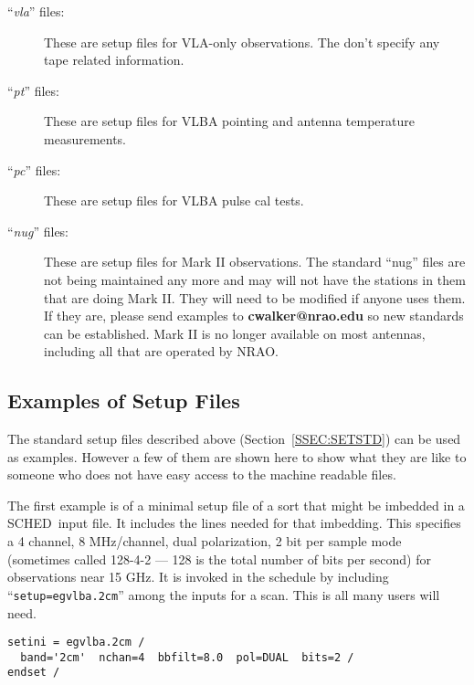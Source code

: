 \documentclass{report}
\newcommand{\schedb}{{\sc SCHED~}}
\begin{document}
\begin{description}
\item[``{\sl vla}'' files:]  These are setup files for VLA-only
observations.  The don't specify any tape related information.

\item[``{\sl pt}'' files:] These are setup files for VLBA pointing and
antenna temperature measurements.

\item[``{\sl pc}'' files:] These are setup files for VLBA pulse cal
tests.

\item[``{\sl nug}'' files:]  These are setup files for Mark II
observations.  The standard ``nug'' files are not being maintained any
more and may will not have the stations in them that are doing Mark
II.  They will need to be modified if anyone uses them.  If they are,
please send examples to {\bf cwalker@nrao.edu} so new standards can be
established.  Mark II is no longer available on most antennas,
including all that are operated by NRAO.

\end{description}



\subsection{\label{SSEC:SETEGS}Examples of Setup Files}

The standard setup files described above (Section~\ref{SSEC:SETSTD})
can be used as examples.  However a few of them are shown here
to show what they are like to someone who does not have easy access
to the machine readable files.

\newpage

  The first example is of a minimal setup file of a sort that might be
imbedded in a \schedb input file.  It includes the lines needed for
that imbedding.  This specifies a 4 channel, 8 MHz/channel, dual
polarization, 2 bit per sample mode (sometimes called 128-4-2 --- 128
is the total number of bits per second) for observations near 15 GHz.
It is invoked in the schedule by including ``{\tt setup=egvlba.2cm}''
among the inputs for a scan.  This is all many users will need.

\begin{verbatim}
setini = egvlba.2cm /
  band='2cm'  nchan=4  bbfilt=8.0  pol=DUAL  bits=2 /
endset /
\end{verbatim}

\newpage
\end{document}

